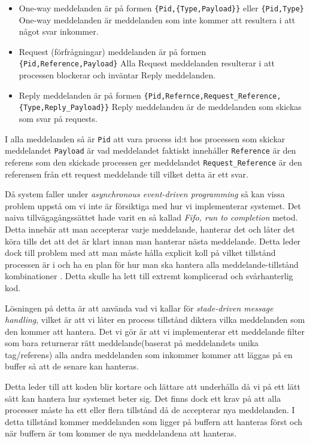 \begin{itemize}

\item One-way meddelanden är på formen \verb+{Pid,{Type,Payload}}+ eller \verb+{Pid,Type}+
	One-way meddelanden är meddelanden som inte kommer att resultera i att något svar inkommer.

\item	Request (förfrågningar) meddelanden är på formen \verb+{Pid,Reference,Payload}+
	Alla Request meddelanden resulterar i att processen blockerar och inväntar Reply meddelanden.

\item	Reply meddelanden är på formen \verb+{Pid,Refernce,Request_Reference,{Type,Reply_Payload}}+
	Reply meddelanden är de meddelanden som skickas som svar på requests.

\end{itemize}


I alla meddelanden så är \verb+Pid+ att vara process id:t hos processen som skickar meddelandet \verb+Payload+ är vad meddelandet faktiskt innehåller  \verb+Reference+ är den referens som den skickade processen ger meddelandet \verb+Request_Reference+ är den referensen från ett request meddelande till vilket detta är ett svar.

Då system faller under \emph{ asynchronous event-driven programming} så kan vissa problem uppstå om vi inte är försiktiga med hur vi implementerar systemet. Det naiva tillvägagångssättet hade varit en så kallad \emph{Fifo, run to completion} metod. Detta innebär att man accepterar varje meddelande, hanterar det och låter det köra tills det att det är klart innan man hanterar nästa meddelande. Detta leder dock  till problem med att man måste hålla explicit koll på vilket tillstånd processen är i och ha en plan för hur man ska hantera alla meddelande-tillstånd kombinationer . Detta skulle ha lett till extremt komplicerad och svårhanterlig kod.\citep{Reference5}

Lösningen på detta är att använda vad vi kallar för \emph{stade-driven message handling}, vilket är att vi låter en process tillstånd diktera vilka meddelanden som den kommer att hantera. Det vi gör är att vi implementerar ett meddelande filter som bara returnerar rätt meddelande(baserat på meddelandets unika tag/referens) alla andra meddelanden som inkommer kommer att läggas på en buffer så att de senare kan hanteras.

Detta leder till att koden blir kortare och lättare att underhålla då vi på ett lätt sätt kan hantera hur systemet beter sig. Det finns dock ett krav på att alla processer måste ha ett eller flera tillstånd då de accepterar nya meddelanden. I detta tillstånd kommer meddelanden som ligger på buffern att hanteras först och när buffern är tom  kommer de nya meddelandena att hanteras.


